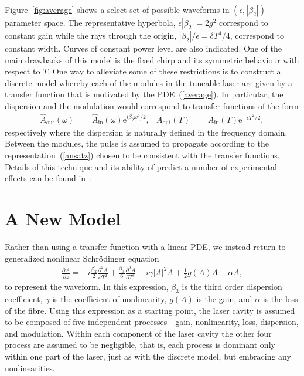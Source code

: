 \documentclass[12pt]{article}
\newcommand{\pdiff}[3][]{\frac{\partial^{#1}#2}{\partial{#3}^{#1}}}
\begin{document}
Figure~\ref{fig:average} shows a select set of possible waveforms in $(\epsilon,|\beta_2|)$ parameter space. The representative hyperbola, $\epsilon|\beta_2| = 2g^2$ correspond to constant gain while the rays through the origin, $|\beta_2|/\epsilon = \delta T^4/4$, correspond to constant width. Curves of constant power level are also indicated. One of the main drawbacks of this model is the fixed chirp and its symmetric behaviour with respect to $T$. One way to alleviate some of these restrictions is to construct a discrete model whereby each of the modules in the tuneable laser are given by a transfer function that is motivated by the PDE~(\ref{average}). In particular, the dispersion and the modulation would correspond to transfer functions of the form
\begin{align}
	\hat{A}_{\textrm{out}}(\omega) &= \hat{A}_{\textrm{in}}(\omega)\textrm{e}^{i\beta_2\omega^2/2},&
	A_{\textrm{out}}(T) &= A_{\textrm{in}}(T)\textrm{e}^{-\epsilon T^2/2},
\end{align}
respectively where the dispersion is naturally defined in the frequency domain. Between the modules, the pulse is assumed to propagate according to the representation~(\ref{ansatz}) chosen to be consistent with the transfer functions. Details of this technique and its ability of predict a number of experimental effects can be found in~\cite{burgoyne2014}.

\section{A New Model}
Rather than using a transfer function with a linear PDE, we instead return to generalized nonlinear Schr\"odinger equation~\cite{agrawal2013, ferreira, shtyrina, yarutkina} 
\begin{align}
\label{eq:nlse}
\pdiff{A}{z} = - i \frac{\beta_2}{2}\pdiff[2]{A}{T} + \frac{\beta_3}{6}\pdiff[3]{A}{T} 
+ i \gamma |A|^2 A + \frac{1}{2}g(A) A - \alpha A,
\end{align}
to represent the waveform. In this expression, $\beta_3$ is the third order dispersion coefficient, $\gamma$ is the coefficient of nonlinearity, $g(A)$ is the gain, and $\alpha$ is the loss of the fibre. Using this expression as a starting point, the laser cavity is assumed to be composed of five independent processes---gain, nonlinearity, loss, dispersion, and modulation. Within each component of the laser cavity the other four process are assumed to be negligible, that is, each process is dominant only within one part of the laser, just as with the discrete model, but embracing any nonlinearities.
\end{document}
